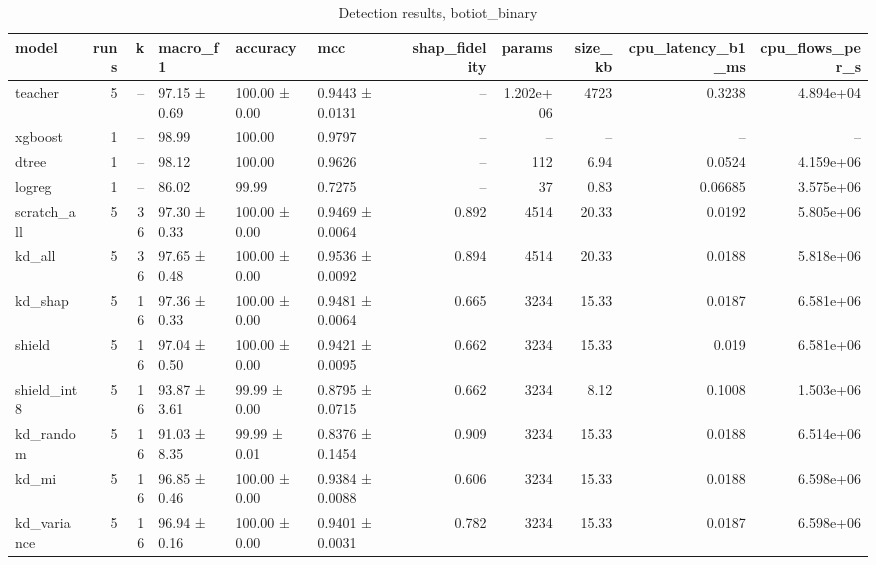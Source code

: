 \begin{table}
\caption{Detection results, botiot_binary}
\begin{tabular}{lrrlllrrrrr}
\toprule
model & runs & k & macro_f1 & accuracy & mcc & shap_fidelity & params & size_kb & cpu_latency_b1_ms & cpu_flows_per_s \\
\midrule
teacher & 5 & -- & 97.15 ± 0.69 & 100.00 ± 0.00 & 0.9443 ± 0.0131 & -- & 1.202e+06 & 4723 & 0.3238 & 4.894e+04 \\
xgboost & 1 & -- & 98.99 & 100.00 & 0.9797 & -- & -- & -- & -- & -- \\
dtree & 1 & -- & 98.12 & 100.00 & 0.9626 & -- & 112 & 6.94 & 0.0524 & 4.159e+06 \\
logreg & 1 & -- & 86.02 & 99.99 & 0.7275 & -- & 37 & 0.83 & 0.06685 & 3.575e+06 \\
scratch_all & 5 & 36 & 97.30 ± 0.33 & 100.00 ± 0.00 & 0.9469 ± 0.0064 & 0.892 & 4514 & 20.33 & 0.0192 & 5.805e+06 \\
kd_all & 5 & 36 & 97.65 ± 0.48 & 100.00 ± 0.00 & 0.9536 ± 0.0092 & 0.894 & 4514 & 20.33 & 0.0188 & 5.818e+06 \\
kd_shap & 5 & 16 & 97.36 ± 0.33 & 100.00 ± 0.00 & 0.9481 ± 0.0064 & 0.665 & 3234 & 15.33 & 0.0187 & 6.581e+06 \\
shield & 5 & 16 & 97.04 ± 0.50 & 100.00 ± 0.00 & 0.9421 ± 0.0095 & 0.662 & 3234 & 15.33 & 0.019 & 6.581e+06 \\
shield_int8 & 5 & 16 & 93.87 ± 3.61 & 99.99 ± 0.00 & 0.8795 ± 0.0715 & 0.662 & 3234 & 8.12 & 0.1008 & 1.503e+06 \\
kd_random & 5 & 16 & 91.03 ± 8.35 & 99.99 ± 0.01 & 0.8376 ± 0.1454 & 0.909 & 3234 & 15.33 & 0.0188 & 6.514e+06 \\
kd_mi & 5 & 16 & 96.85 ± 0.46 & 100.00 ± 0.00 & 0.9384 ± 0.0088 & 0.606 & 3234 & 15.33 & 0.0188 & 6.598e+06 \\
kd_variance & 5 & 16 & 96.94 ± 0.16 & 100.00 ± 0.00 & 0.9401 ± 0.0031 & 0.782 & 3234 & 15.33 & 0.0187 & 6.598e+06 \\
\bottomrule
\end{tabular}
\end{table}
